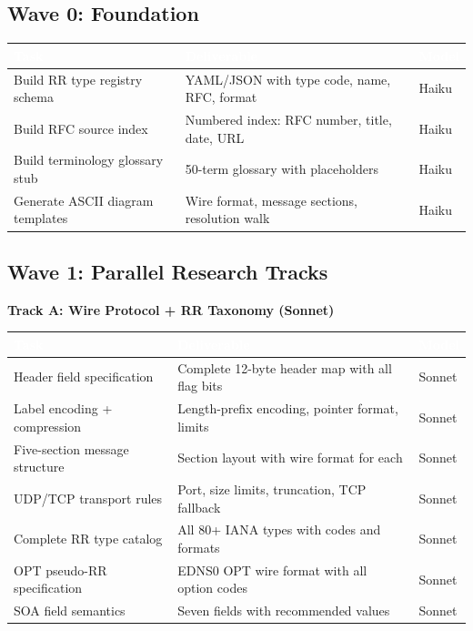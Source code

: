 \documentclass[11pt,letterpaper]{article}
\newcommand{\tableheader}[1]{\textbf{\sffamily\textcolor{white}{#1}}}
\begin{document}
\subsection{Wave 0: Foundation}

\begin{center}
\begin{tabularx}{\textwidth}{L{4cm}XC{1.8cm}}
\toprule
{}
\tableheader{Task} & \tableheader{Deliverable} & \tableheader{Model} \\
\midrule
Build RR type registry schema & YAML/JSON with type code, name, RFC, format & Haiku \\
Build RFC source index & Numbered index: RFC number, title, date, URL & Haiku \\
Build terminology glossary stub & 50-term glossary with placeholders & Haiku \\
Generate ASCII diagram templates & Wire format, message sections, resolution walk & Haiku \\
\bottomrule
\end{tabularx}
\end{center}

\subsection{Wave 1: Parallel Research Tracks}

\textbf{Track A: Wire Protocol + RR Taxonomy (Sonnet)}

\begin{center}
\begin{tabularx}{\textwidth}{L{4cm}XC{1.8cm}}
\toprule
{}
\tableheader{Task} & \tableheader{Deliverable} & \tableheader{Model} \\
\midrule
Header field specification & Complete 12-byte header map with all flag bits & Sonnet \\
Label encoding + compression & Length-prefix encoding, pointer format, limits & Sonnet \\
Five-section message structure & Section layout with wire format for each & Sonnet \\
UDP/TCP transport rules & Port, size limits, truncation, TCP fallback & Sonnet \\
Complete RR type catalog & All 80+ IANA types with codes and formats & Sonnet \\
OPT pseudo-RR specification & EDNS0 OPT wire format with all option codes & Sonnet \\
SOA field semantics & Seven fields with recommended values & Sonnet \\
\bottomrule
\end{tabularx}
\end{center}
\end{document}
